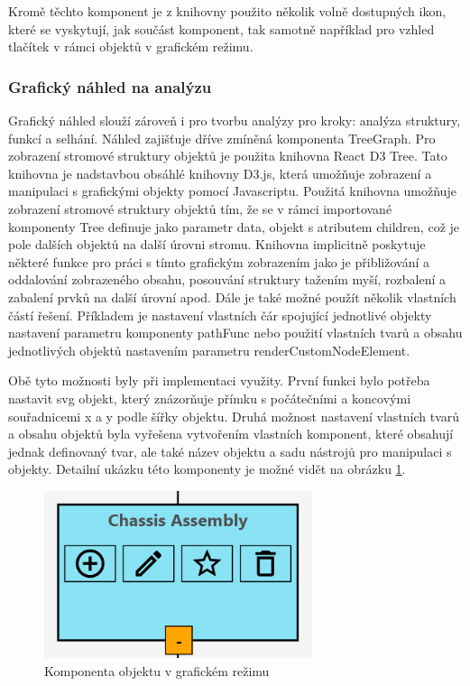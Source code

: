 Kromě těchto komponent je z knihovny použito několik volně dostupných ikon, které se vyskytují, jak součást komponent, tak samotně například pro vzhled tlačítek v rámci objektů v grafickém režimu. 

\subsubsection{Grafický náhled na analýzu}
Grafický náhled slouží zároveň i pro tvorbu analýzy pro kroky: analýza struktury, funkcí a selhání. Náhled zajišťuje dříve zmíněná komponenta TreeGraph. Pro zobrazení stromové struktury objektů je použita knihovna React D3 Tree\cite{d3tree}. Tato knihovna je nadstavbou obsáhlé knihovny D3.js, která umožňuje zobrazení a manipulaci s grafickými objekty pomocí Javascriptu. Použitá knihovna umožňuje zobrazení stromové struktury objektů tím, že se v rámci importované komponenty Tree definuje jako parametr data, objekt s atributem children, což je pole dalších objektů na další úrovni stromu. Knihovna implicitně poskytuje některé funkce pro práci s tímto grafickým zobrazením jako je přibližování a oddalování zobrazeného obsahu, posouvání struktury tažením myší, rozbalení a zabalení prvků na další úrovní apod. Dále je také možné použít několik vlastních částí řešení. Příkladem je nastavení vlastních čár spojující jednotlivé objekty nastavení parametru komponenty pathFunc nebo použití vlastních tvarů a obsahu jednotlivých objektů nastavením parametru renderCustomNodeElement.

Obě tyto možnosti byly při implementaci využity. První funkci bylo potřeba nastavit svg objekt, který znázorňuje přímku s počátečními a koncovými souřadnicemi x a y podle šířky objektu. Druhá možnost nastavení vlastních tvarů a obsahu objektů byla vyřešena vytvořením vlastních komponent, které obsahují jednak definovaný tvar, ale také název objektu a sadu nástrojů pro manipulaci s objekty. Detailní ukázku této komponenty je možné vidět na obrázku \ref{fig:node}.


\begin{figure}[h]
\centering
	\includegraphics[width=0.7\textwidth]{Figures/node.png}
	\caption{Komponenta objektu v grafickém režimu}
	\label{fig:node}
\end{figure}

